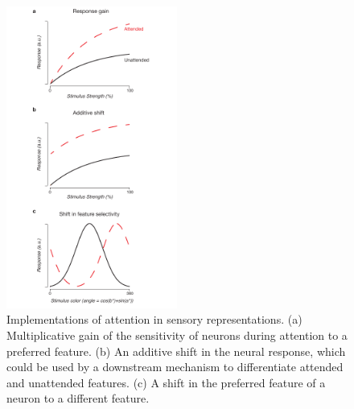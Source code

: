 \begin{figure}[ht]
\centering
\includegraphics[keepaspectratio,width=0.5\textwidth]{figs_c0/attention_models.pdf}
\caption[Sensory implementations of attention]{Implementations of attention in sensory representations. (a) Multiplicative gain of the sensitivity of neurons during attention to a preferred feature. (b) An additive shift in the neural response, which could be used by a downstream mechanism to differentiate attended and unattended features. (c) A shift in the preferred feature of a neuron to a different feature.}
\label{fig:c0f3}
\end{figure}

